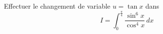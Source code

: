 Effectuer le changement de variable $u=\tan x$ dans
\begin{displaymath}
 I=\int_{0}^{\frac{\pi}{4}}\frac{\sin^6 x}{\cos^4 x}\,dx
\end{displaymath}
\bigskip \bigskip